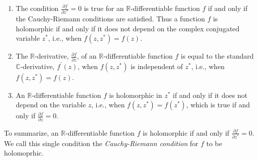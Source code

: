 \documentclass[11pt]{article}
\begin{document}
\begin{enumerate}
\item The condition $\frac{\partial f}{\partial z^*} = 0$ is true for an $\mathbb R$-differentiable function $f$ if and only if the Cauchy-Riemann conditions are satisfied. Thus a function $f$  is holomorphic if and only if it does not depend on the complex conjugated variable $z^*$, i.e., when $f(z, z^*) = f(z)$.
\item The $\mathbb R$-derivative, $\frac{\partial f}{\partial z}$, of an $\mathbb R$-differentiable function $f$ is equal to the standard $\mathbb C$-derivative, $f^\prime(z)$, when $f(z, z^*)$ is independent of $z^*$, i.e., when $f(z, z^*) = f(z)$.
\item An $\mathbb R$-differentiable function $f$ is holomorphic in $z^*$ if and only if it does not depend on the variable $z$, i.e., when $f(z, z^*) = f(z^*)$, which is true if and only if $\frac{\partial f}{\partial z} = 0$.
\end{enumerate}
To summarize, an $\mathbb R$-differentiable function $f$ is holomorphic if and only if $\frac{\partial f}{\partial z^*} = 0$. We call this single condition the \textit{Cauchy-Riemann condition} for $f$ to be holomoprhic.
\end{document}
